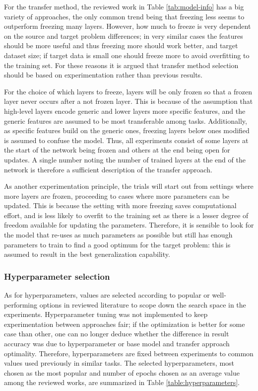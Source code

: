 \documentclass{article}
\begin{document}
For the transfer method, the reviewed work in Table \ref{tab:model-info} has a big variety of approaches, 
the only common trend being that freezing less seems to outperform freezing many layers. 
However, how much to freeze is very dependent on the source and target problem differences;
in very similar cases the features should be more useful and thus freezing more should work better, 
and target dataset size; if target data is small one should freeze more to avoid overfitting 
to the training set. For these reasons it is argued that transfer method selection should be
based on experimentation rather than previous results.

For the choice of which layers to freeze, layers will be only frozen so that a frozen layer never 
occurs after a not frozen layer. This is because of the assumption that high-level layers 
encode generic and lower layers more specific features, and the generic features are assumed to be most transferable among tasks.
 Additionally, as specific features build on the generic ones, freezing layers 
below ones modified is assumed to confuse the model. Thus, all experiments consist of some layers 
at the start of the network being frozen and others at the end being open for updates.
A single number noting the number of trained layers at the end of the network is therefore 
a sufficient description of the transfer approach.

As another experimentation principle, the trials will start out from settings where more layers are frozen, proceeding to
cases where more parameters can be updated. This is because the setting with more freezing saves 
computational effort, and is less likely to overfit to the training set as there is a lesser degree of freedom 
available for updating the parameters. Therefore, it is sensible to look for the model that re-uses as 
much parameters as possible but still has enough parameters to train to find a good optimum for the target problem:
this is assumed to result in the best generalization capability.

\subsubsection{Hyperparameter selection}

As for hyperparameters, values are selected according to popular or well-performing 
options in reviewed literature to scope down the search space in the experiments.
Hyperparameter tuning was not implemented to keep experimentation 
between approaches fair; if the optimization is better for some case than other, one can no 
longer deduce whether the difference in result accuracy was due to hyperparameter or base model and 
transfer approach optimality. Therefore, hyperparameters are fixed between experiments to common values 
used previously in similar tasks. The selected hyperparameters, most chosen as the most popular and 
number of epochs chosen as an average value among the reviewed works, are summarized in Table \ref{table:hyperparameters}.
\end{document}
